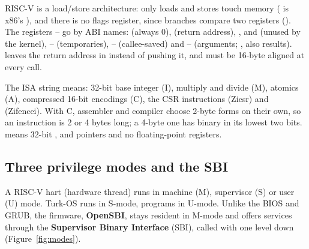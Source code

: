 \documentclass[11pt,a4paper]{article}
\begin{document}
RISC-V is a load/store architecture: only loads and stores touch memory ( is x86's
), and there is no flags register, since branches compare two registers ().
The registers -- go by ABI names:  (always 0),  (return address), ,
 and  (unused by the kernel), -- (temporaries), --
(callee-saved) and -- (arguments; ,  also results).  leaves the return
address in  instead of pushing it, and  must be 16-byte aligned at every call.

The ISA string  means: 32-bit base integer (I), multiply and divide (M), atomics (A),
compressed 16-bit encodings (C), the CSR instructions (Zicsr) and  (Zifencei). With C, assembler and
compiler choose 2-byte forms on their own, so an instruction is 2 or 4 bytes long; a 4-byte one has binary  in
its lowest two bits.  means 32-bit ,  and pointers and no floating-point
registers.

\subsection{Three privilege modes and the SBI}

A RISC-V hart (hardware thread) runs in machine (M), supervisor (S) or user (U) mode. Turk-OS runs in S-mode,
programs in U-mode. Unlike the BIOS and GRUB, the firmware, \textbf{OpenSBI}, stays resident in M-mode and offers
services through the \textbf{Supervisor Binary Interface} (SBI), called with  one level down
(Figure~\ref{fig:modes}).
\end{document}
